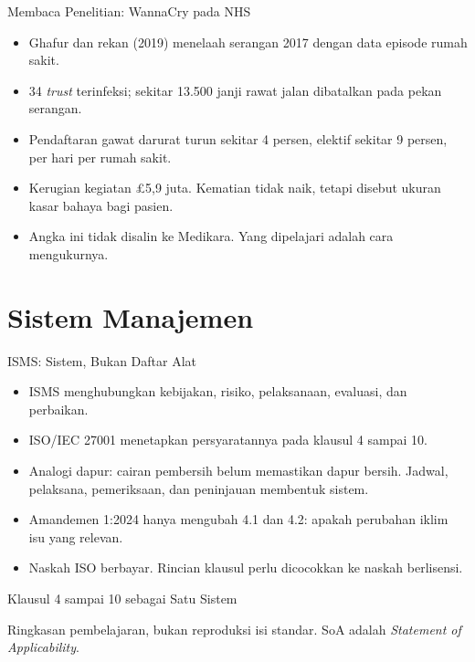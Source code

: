 \documentclass[aspectratio=169, table, 12pt]{beamer}
\begin{document}
\begin{frame}{{\Large Membaca Penelitian: WannaCry pada NHS}}
  \vspace{6pt}
  \small
  \begin{itemize}
    \item Ghafur dan rekan (2019) menelaah serangan 2017 dengan data episode rumah sakit.
    \item 34 \textit{trust} terinfeksi; sekitar 13.500 janji rawat jalan dibatalkan pada pekan
          serangan.
    \item Pendaftaran gawat darurat turun sekitar 4 persen, elektif sekitar 9 persen, per hari per
          rumah sakit.
    \item Kerugian kegiatan £5,9 juta. Kematian tidak naik, tetapi disebut ukuran kasar bahaya bagi
          pasien.
    \item Angka ini tidak disalin ke Medikara. Yang dipelajari adalah cara mengukurnya.
  \end{itemize}
\end{frame}

\section{Sistem Manajemen}

\begin{frame}{{\Large ISMS: Sistem, Bukan Daftar Alat}}
  \vspace{6pt}
  \small
  \begin{itemize}
    \item ISMS menghubungkan kebijakan, risiko, pelaksanaan, evaluasi, dan perbaikan.
    \item ISO/IEC 27001 menetapkan persyaratannya pada klausul 4 sampai 10.
    \item Analogi dapur: cairan pembersih belum memastikan dapur bersih. Jadwal, pelaksana,
          pemeriksaan, dan peninjauan membentuk sistem.
    \item Amandemen 1:2024 hanya mengubah 4.1 dan 4.2: apakah perubahan iklim isu yang relevan.
    \item Naskah ISO berbayar. Rincian klausul perlu dicocokkan ke naskah berlisensi.
  \end{itemize}
\end{frame}

\begin{frame}{{\Large Klausul 4 sampai 10 sebagai Satu Sistem}}
  \vspace{6pt}
  \begin{center}
    \resizebox{0.95\textwidth}{!}{}
  \end{center}
  \small Ringkasan pembelajaran, bukan reproduksi isi standar. SoA adalah \textit{Statement of
  Applicability}.
\end{frame}
\end{document}

